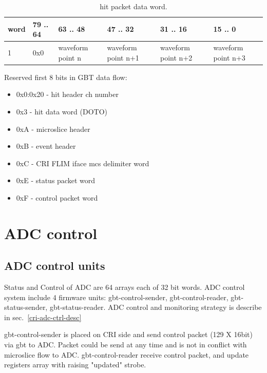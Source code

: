 \documentclass{article}
\begin{document}
\begin{table}[H]
\centering
\begin{tabular}{| l | l | l | l | l | l |}
\hline
word & 79 .. 64 & 63 .. 48 & 47 .. 32 & 31 .. 16 & 15 .. 0 \\ \hline
1 & 0x0 & waveform point n & waveform point n+1 & waveform point n+2 & waveform point n+3 \\ \hline
\end{tabular}
\caption{hit packet data word.\label{tab3}}
\end{table}

Reserved first 8 bits in GBT data flow:
\begin{itemize}
\item 0x0:0x20 - hit header ch number

\item 0x3 - hit data word (DOTO)

\item 0xA - microslice header

\item 0xB - event header

\item 0xC - CRI FLIM iface mcs delimiter word

\item 0xE - status packet word

\item 0xF - control packet word
\end{itemize}



\section{ADC control}



\subsection{ADC control units}\label{sec:adc-control}
Status and Control of ADC are 64 arrays each of 32 bit words.
ADC control system include 4 firmware units: gbt-control-sender, gbt-control-reader, gbt-status-sender, gbt-status-reader. ADC control and monitoring strategy is describe in sec.~\ref{cri-adc-ctrl-desc}

gbt-control-sender is placed on CRI side and send control packet (129 X 16bit) via gbt to ADC. Packet could be send at any time and is not in conflict with microslice flow to ADC. gbt-control-reader receive control packet, and update registers array with raising "updated" strobe.
\end{document}

